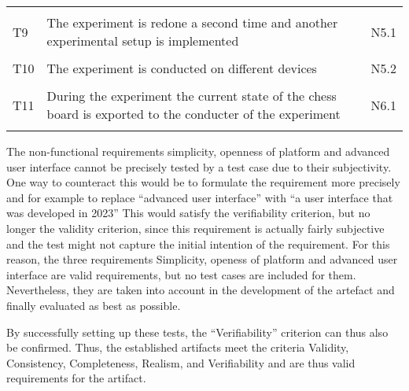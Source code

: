 \begin{table}[htbp]
\begin{tabular}{L{0.04\textwidth}L{0.7\textwidth}L{0.15\textwidth}}
    & \\
    T9  & The experiment is redone a second time and another experimental setup is implemented                                                     & N5.1                         \\
    & \\
    T10 & The experiment is conducted on different devices                                                                                         & N5.2                         \\
    & \\
    T11 & During the experiment the current state of the chess board is exported to the conducter of the experiment                                & N6.1                         \\ 
    & \\ \hline
    \end{tabular}
    \end{table}

The non-functional requirements simplicity, openness of platform and advanced user interface cannot be precisely tested by a test case due to their subjectivity. One way to counteract this would be to formulate the requirement more precisely and for example to replace \enquote{advanced user interface} with \enquote{a user interface that was developed in 2023} This would satisfy the verifiability criterion, but no longer the validity criterion, since this requirement is actually fairly subjective and the test might not capture the initial intention of the requirement. For this reason, the three requirements Simplicity, openess of platform and advanced user interface are valid requirements, but no test cases are included for them. Nevertheless, they are taken into account in the development of the artefact and finally evaluated as best as possible.

By successfully setting up these tests, the \enquote{Verifiability} criterion can thus also be confirmed. Thus, the established artifacts meet the criteria Validity, Consistency, Completeness, Realism, and Verifiability and are thus valid requirements for the artifact.






